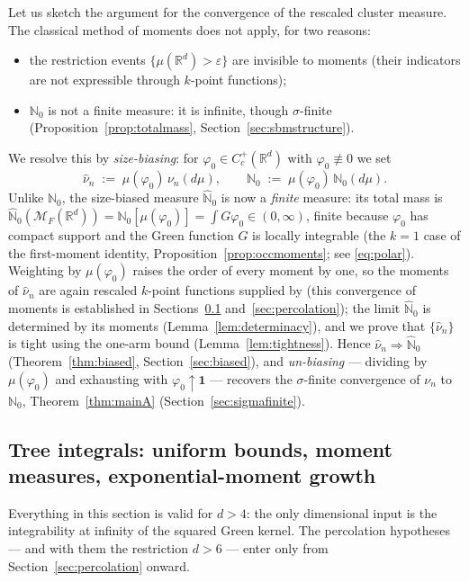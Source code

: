 \documentclass[11pt]{article}
\theoremstyle{definition}
\theoremstyle{remark}
\newcommand{\R}{\mathbb{R}}
\newcommand{\bN}{{\mathbb{N}_0}}                 %
\newcommand{\cM}{{\mathcal{M}_F(\R^d)}}          %
\newcommand{\Cc}{C_c^+(\R^d)}
\newcommand{\eps}{\varepsilon}
\newcommand{\nuh}{\hat{\nu}}
\newcommand{\Nh}{\hat{\mathbb{N}}_0}
\numberwithin{equation}{section}
\theoremstyle{plain}
\theoremstyle{definition}
\theoremstyle{remark}
\theoremstyle{plain}
\begin{document}
Let us sketch the argument for the convergence of the rescaled cluster
measure. The classical method of moments does not apply, for two reasons:
\begin{itemize}
\item the restriction events $\{\mu(\R^d)>\eps\}$ are invisible to moments
(their indicators are not expressible through $k$-point functions);
\item $\bN$ is not a finite measure: it is infinite, though
$\sigma$-finite (Proposition~\ref{prop:totalmass},
Section~\ref{sec:sbmstructure}).

\end{itemize}
We resolve
this by \emph{size-biasing}: for $\varphi_0\in\Cc$ with $\varphi_0\not\equiv0$ we set
\begin{equation}\label{eq:sizebias}
\nuh_n \;:=\; \mu(\varphi_0)\,\nu_n(d\mu),
\qquad
\Nh \;:=\; \mu(\varphi_0)\,\bN(d\mu).
\end{equation}
Unlike $\bN$, the size-biased measure $\Nh$ is now a
\emph{finite} measure: its total mass is
$\Nh(\cM)=\bN[\mu(\varphi_0)]=\int G\varphi_0\in(0,\infty)$, finite because
$\varphi_0$ has compact support and the Green function $G$ is locally integrable
(the $k=1$ case of the first-moment identity, Proposition~\ref{prop:occmoments};
see \eqref{eq:polar}).
Weighting by $\mu(\varphi_0)$ raises the order of every moment by one, so the
moments of $\nuh_n$ are again rescaled $k$-point functions supplied by
\cite{CCHS26} (this convergence of moments is established in
Sections~\ref{sec:trees} and~\ref{sec:percolation}); the limit $\Nh$ is determined by its moments
(Lemma~\ref{lem:determinacy}), and we prove that $\{\nuh_n\}$ is tight using the one-arm bound
\cite{KN11} (Lemma~\ref{lem:tightness}). Hence $\nuh_n\Rightarrow\Nh$
(Theorem~\ref{thm:biased}, Section~\ref{sec:biased}), and \emph{un-biasing} --- dividing by
$\mu(\varphi_0)$ and exhausting with $\varphi_0\uparrow\mathbf 1$ --- recovers
the $\sigma$-finite convergence of $\nu_n$ to $\bN$, Theorem~\ref{thm:mainA}
(Section~\ref{sec:sigmafinite}).

\subsection{Tree integrals: uniform bounds, moment measures, exponential-moment growth}
\label{sec:trees}

Everything in this section is valid for $d>4$: the only dimensional input is
the integrability at infinity of the squared Green kernel. The percolation hypotheses --- and with them the restriction $d>6$ ---
enter only from Section~\ref{sec:percolation} onward.
\end{document}
